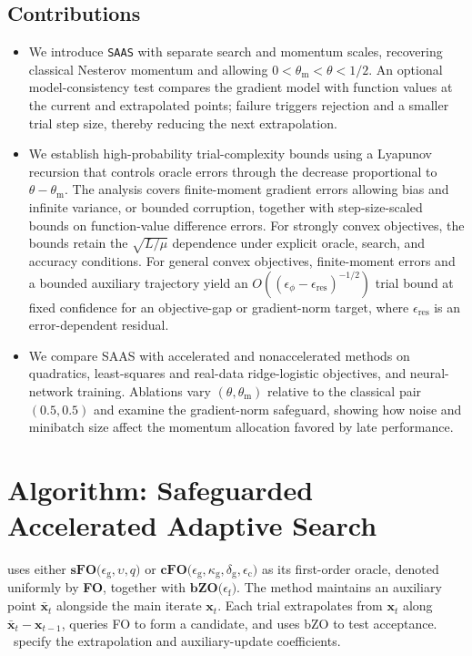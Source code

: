 \documentclass{article}
\begin{document}
\subsection{Contributions}

\begin{itemize}[leftmargin=0.4cm]

\item
We introduce \texttt{SAAS} with separate search and momentum scales, recovering classical Nesterov momentum and allowing $0<\theta_{\mathrm m}<\theta<1/2$. An optional model-consistency test compares the gradient model with function values at the current and extrapolated points; failure triggers rejection and a smaller trial step size, thereby reducing the next extrapolation.

\item
We establish high-probability trial-complexity bounds using a Lyapunov recursion that controls oracle errors through the decrease proportional to $\theta-\theta_{\mathrm m}$. The analysis covers finite-moment gradient errors allowing bias and infinite variance, or bounded corruption, together with step-size-scaled bounds on function-value difference errors. For strongly convex objectives, the bounds retain the $\sqrt{L/\mu}$ dependence under explicit oracle, search, and accuracy conditions. For general convex objectives, finite-moment errors and a bounded auxiliary trajectory yield an $O((\epsilon_\phi-\epsilon_{\mathrm{res}})^{-1/2})$ trial bound at fixed confidence for an objective-gap or gradient-norm target, where $\epsilon_{\mathrm{res}}$ is an error-dependent residual.

\item
We compare SAAS with accelerated and nonaccelerated methods on quadratics, least-squares and real-data ridge-logistic objectives, and neural-network training. Ablations vary $(\theta,\theta_{\mathrm m})$ relative to the classical pair $(0.5,0.5)$ and examine the gradient-norm safeguard, showing how noise and minibatch size affect the momentum allocation favored by late performance.
\end{itemize}

\section{Algorithm: Safeguarded Accelerated Adaptive Search}\label{section_algo}
 uses either \(\textbf{sFO(}\epsilon_{\mathrm g},\upsilon,q\textbf{)}\) or \(\textbf{cFO(}\epsilon_{\mathrm g},\kappa_{\mathrm g},\delta_{\mathrm g},\epsilon_{\mathrm c}\textbf{)}\) as its first-order oracle, denoted uniformly by \textbf{FO}, together with \(\textbf{bZO(}\epsilon_{\mathrm f}\textbf{)}\). The method maintains an auxiliary point $\bar{\bm x}_t$ alongside the main iterate $\bm x_t$. Each trial extrapolates from $\bm x_t$ along $\bar{\bm x}_t-\bm x_{t-1}$, queries FO to form a candidate, and uses bZO to test acceptance.  ~specify the extrapolation and auxiliary-update coefficients.
\end{document}
